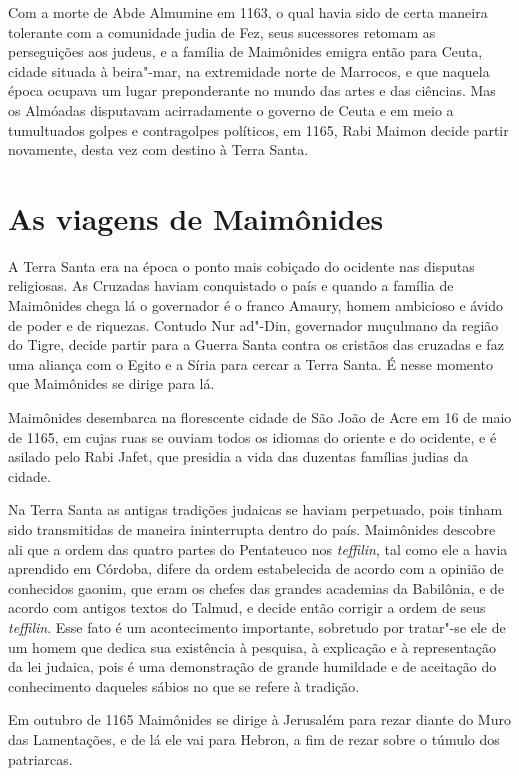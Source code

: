 Com a morte de Abde Almumine em 1163, o qual havia sido de certa maneira
tolerante com a comunidade judia de Fez, seus sucessores retomam as
perseguições aos judeus, e a família de Maimônides emigra então
para Ceuta, cidade situada à beira"-mar, na extremidade norte de
Marrocos, e que naquela época ocupava um lugar preponderante no mundo
das artes e das ciências. Mas os Almóadas disputavam acirradamente o
governo de Ceuta e em meio a tumultuados golpes e contragolpes
políticos, em 1165, Rabi Maimon decide partir novamente, desta vez com
destino à Terra Santa.

\section{As viagens de Maimônides}

A Terra Santa era na época o ponto mais cobiçado do ocidente nas
disputas religiosas. As Cruzadas haviam conquistado o país e quando a
família de Maimônides chega lá o governador é o franco Amaury, homem
ambicioso e ávido de poder e de riquezas. Contudo Nur ad"-Din, governador
muçulmano da região do Tigre, decide partir para a Guerra Santa contra
os cristãos das cruzadas e faz uma aliança com o Egito e a Síria para
cercar a Terra Santa. É nesse momento que Maimônides se dirige para lá.

Maimônides desembarca na florescente cidade de São João de Acre em 16 de
maio de 1165, em cujas ruas se ouviam todos os idiomas do oriente e do
ocidente, e é asilado pelo Rabi Jafet, que presidia a vida das duzentas
famílias judias da cidade.

Na Terra Santa as antigas tradições judaicas se haviam perpetuado, pois
tinham sido transmitidas de maneira ininterrupta dentro do país. Maimônides 
descobre ali que a ordem das quatro partes do Pentateuco nos
\emph{teffilin}, tal como ele a havia aprendido em Córdoba, difere da ordem
estabelecida de acordo com a opinião de conhecidos gaonim, que eram os
chefes das grandes academias da Babilônia, e de acordo com antigos
textos do Talmud, e decide então corrigir a ordem de seus \emph{teffilin}. Esse
fato é um acontecimento importante, sobretudo por tratar"-se ele de um
homem que dedica sua existência à pesquisa, à explicação e à
representação da lei judaica, pois é uma demonstração de grande
humildade e de aceitação do conhecimento daqueles sábios no que se
refere à tradição.

Em outubro de 1165 Maimônides se dirige à Jerusalém para rezar diante
do Muro das Lamentações, e de lá ele vai para Hebron, a fim de rezar
sobre o túmulo dos patriarcas.

